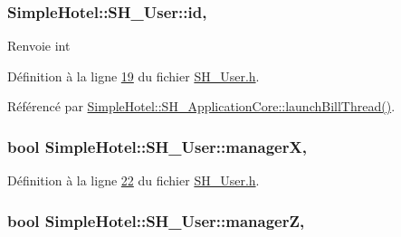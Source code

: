 \hypertarget{classSimpleHotel_1_1SH__User_a492697af8401a2d22b0ecefab4d78da5}{
\subsubsection[{id}]{\setlength{\rightskip}{0pt plus 5cm}Simple\-Hotel\-::\-S\-H\-\_\-\-User\-::id\hspace{0.3cm}{\ttfamily [read]}, {\ttfamily [inherited]}}}\label{classSimpleHotel_1_1SH__User_a492697af8401a2d22b0ecefab4d78da5}
\begin{DoxyReturn}{Renvoie}
int 
\end{DoxyReturn}


Définition à la ligne \hyperlink{SH__User_8h_source_l00019}{19} du fichier \hyperlink{SH__User_8h_source}{S\-H\-\_\-\-User.\-h}.



Référencé par \hyperlink{classSimpleHotel_1_1SH__ApplicationCore_a5e72b1bc2e023f4fc5c2f5dd2ab75b2a}{Simple\-Hotel\-::\-S\-H\-\_\-\-Application\-Core\-::launch\-Bill\-Thread()}.

\hypertarget{classSimpleHotel_1_1SH__User_ac9a48dc5b684b5f4a700a7c4991e759d}{
\subsubsection[{manager\-X}]{\setlength{\rightskip}{0pt plus 5cm}bool Simple\-Hotel\-::\-S\-H\-\_\-\-User\-::manager\-X\hspace{0.3cm}{\ttfamily [read]}, {\ttfamily [inherited]}}}\label{classSimpleHotel_1_1SH__User_ac9a48dc5b684b5f4a700a7c4991e759d}


Définition à la ligne \hyperlink{SH__User_8h_source_l00022}{22} du fichier \hyperlink{SH__User_8h_source}{S\-H\-\_\-\-User.\-h}.

\hypertarget{classSimpleHotel_1_1SH__User_addccc353716a6f4cf15f08ad1a06d2dc}{
\subsubsection[{manager\-Z}]{\setlength{\rightskip}{0pt plus 5cm}bool Simple\-Hotel\-::\-S\-H\-\_\-\-User\-::manager\-Z\hspace{0.3cm}{\ttfamily [read]}, {\ttfamily [inherited]}}}\label{classSimpleHotel_1_1SH__User_addccc353716a6f4cf15f08ad1a06d2dc}


